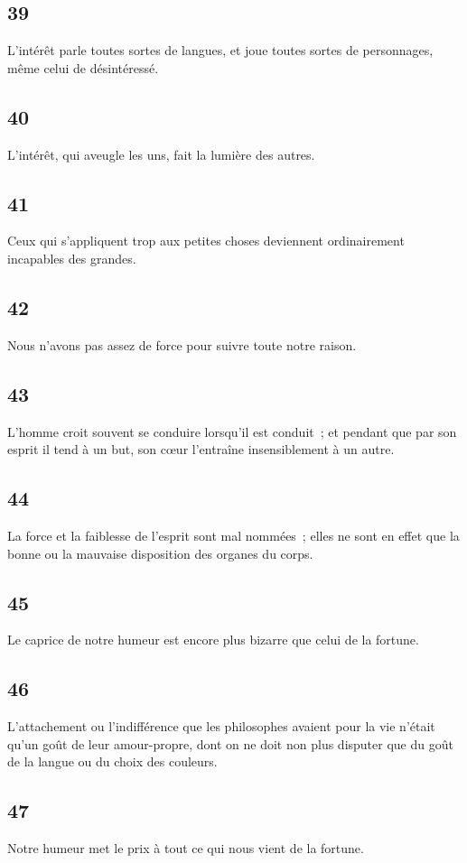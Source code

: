 \documentclass[french,twoside]{book} %
\begin{document}
\subsection[{39}]{ \textsc{39} }
\noindent L’intérêt parle toutes sortes de langues, et joue toutes sortes de personnages, même celui de désintéressé.
\subsection[{40}]{ \textsc{40} }
\noindent L’intérêt, qui aveugle les uns, fait la lumière des autres.
\subsection[{41}]{ \textsc{41} }
\noindent Ceux qui s’appliquent trop aux petites choses deviennent ordinairement incapables des grandes.
\subsection[{42}]{ \textsc{42} }
\noindent Nous n’avons pas assez de force pour suivre toute notre raison.
\subsection[{43}]{ \textsc{43} }
\noindent L’homme croit souvent se conduire lorsqu’il est conduit ; et pendant que par son esprit il tend à un but, son cœur l’entraîne insensiblement à un autre.
\subsection[{44}]{ \textsc{44} }
\noindent La force et la faiblesse de l’esprit sont mal nommées ; elles ne sont en effet que la bonne ou la mauvaise disposition des organes du corps.
\subsection[{45}]{ \textsc{45} }
\noindent Le caprice de notre humeur est encore plus bizarre que celui de la fortune.
\subsection[{46}]{ \textsc{46} }
\noindent L’attachement ou l’indifférence que les philosophes avaient pour la vie n’était qu’un goût de leur amour-propre, dont on ne doit non plus disputer que du goût de la langue ou du choix des couleurs.
\subsection[{47}]{ \textsc{47} }
\noindent Notre humeur met le prix à tout ce qui nous vient de la fortune.
\end{document}
